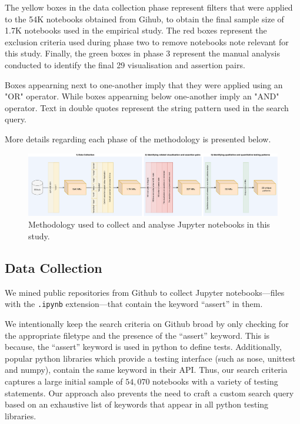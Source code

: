 \documentclass[acmsmall,screen,review,anonymous]{acmart}
\begin{document}
The yellow boxes in the data collection phase represent filters that
were applied to the 54K notebooks obtained from Gihub, to obtain the
final sample size of 1.7K notebooks used in the empirical study. The
red boxes represent the exclusion criteria used during phase two to
remove notebooks note relevant for this study. Finally, the green
boxes in phase 3 represent the manual analysis conducted to identify
the final 29 visualisation and assertion pairs.

Boxes appearning next to one-another imply that they were applied
using an "OR" operator. While boxes appearning below one-another imply
an "AND" operator. Text in double quotes represent the string pattern
used in the search query.

More details regarding each phase of the methodology is presented below.

\begin{figure}
  \centering
  \includegraphics[width=\textwidth]{method.pdf}
  \caption{Methodology used to collect and analyse Jupyter notebooks
    in this study.}
  \label{fig:method}
\end{figure}

\subsection{Data Collection}\label{sec:data-collect}

We mined public repositories from Github to collect Jupyter
notebooks---files with the \texttt{.ipynb} extension---that contain
the keyword ``assert'' in them.


We intentionally keep the search criteria on Github broad by only
checking for the appropriate filetype and the presence of the
``assert'' keyword. This is because, the ``assert'' keyword is used in
python to define tests. Additionally, popular python libraries which
provide a testing interface (such as nose, unittest and numpy),
contain the same keyword in their API. Thus, our search criteria
captures a large initial sample of $54,070$ notebooks with a variety
of testing statements. Our approach also prevents the need to craft a
custom search query based on an exhaustive list of keywords that
appear in all python testing libraries.
\end{document}
